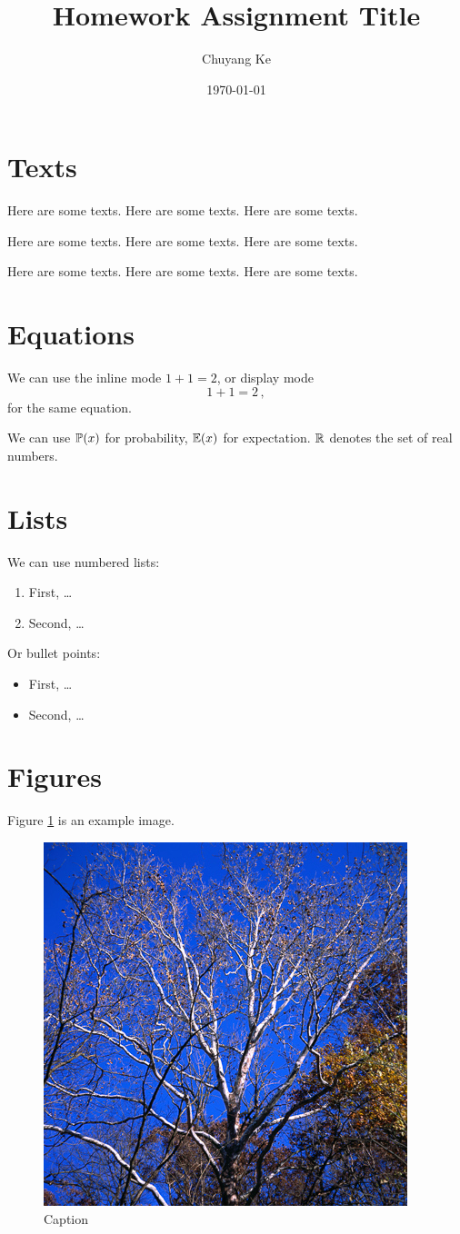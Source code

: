 \documentclass{article}
\title{\textbf{Homework Assignment Title}}
\author{Chuyang Ke}
\date{\today}
\begin{document}
\maketitle


\section{Texts}

Here are some texts. Here are some texts. Here are some texts.

Here are some texts. Here are some texts. Here are some texts.

Here are some texts. Here are some texts. Here are some texts.

\lipsum[1]


\section{Equations}

We can use the inline mode 
$1 + 1 = 2$, 
or display mode
\[
1 + 1 = 2 \,,    
\]
for the same equation.

We can use $\P(x)$ for probability, $\E(x)$ for expectation. $\R$ denotes the set of real numbers.


\section{Lists}
We can use numbered lists:
\begin{enumerate}
    \item First, \dots
    \item Second, \dots
\end{enumerate}
Or bullet points:
\begin{itemize}
    \item First, \dots
    \item Second, \dots
\end{itemize}


\section{Figures}
Figure \ref{fig:example} is an example image.
\begin{figure}[h]
    \centering
    \includegraphics[width=0.25\linewidth]{figs/example.jpg}
    \caption{Caption}
    \label{fig:example}
\end{figure}



\end{document}
